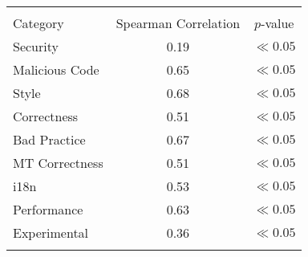 
\begin{tabular}{lcc}
\hline \\
Category & Spearman Correlation & $p$-value \\ \hline 
Security & 0.19 & $\ll 0.05$\\
Malicious Code & 0.65 & $\ll 0.05$\\
Style & 0.68 & $\ll 0.05$\\
Correctness & 0.51 & $\ll 0.05$\\
Bad Practice & 0.67 & $\ll 0.05$\\
MT Correctness & 0.51 & $\ll 0.05$\\
i18n & 0.53 & $\ll 0.05$\\
Performance & 0.63 & $\ll 0.05$\\
Experimental & 0.36 & $\ll 0.05$\\
\hline \\
\end{tabular}
